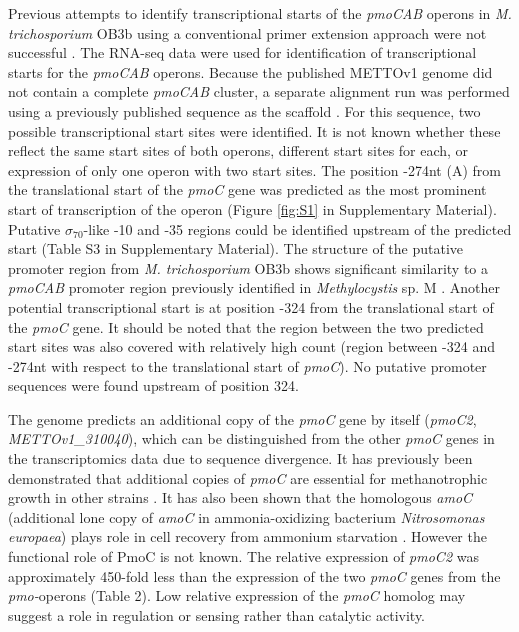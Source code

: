 Previous attempts to identify transcriptional starts of the \textit{pmoCAB} operons in \textit{M. trichosporium} OB3b using a conventional primer extension approach were not successful \cite{gilbert2000}.
The RNA-seq data were used for identification of transcriptional starts for the \textit{pmoCAB} operons.
Because the published METTOv1 genome did not contain a complete \textit{pmoCAB} cluster, a separate alignment run was performed using a previously published sequence as the scaffold \cite{holmes1995}.
For this sequence, two possible transcriptional start sites were identified.
It is not known whether these reflect the same start sites of both operons, different start sites for each, or expression of only one operon with two start sites.
The position -274nt (A) from the translational start of the \textit{pmoC} gene was predicted as the most prominent start of transcription of the operon (Figure \ref{fig:S1} in Supplementary Material).
Putative $\sigma_{70}$-like -10 and -35 regions could be identified upstream of the predicted start (Table S3 in Supplementary Material).
The structure of the putative promoter region from \textit{M. trichosporium} OB3b shows significant similarity to a \textit{pmoCAB} promoter region previously identified in \textit{Methylocystis} sp. M \cite{gilbert2000}.
Another potential transcriptional start is at position -324 from the translational start of the \textit{pmoC} gene.
It should be noted that the region between the two predicted start sites was also covered with relatively high count (region between -324 and -274nt with respect to the translational start of \textit{pmoC}).
No putative promoter sequences were found upstream of position 324.

The genome predicts an additional copy of the \textit{pmoC} gene by itself (\textit{pmoC2}, \textit{METTOv1\_310040}), which can be distinguished from the other \textit{pmoC} genes in the transcriptomics data due to sequence divergence.
It has previously been demonstrated that additional copies of \textit{pmoC} are essential for methanotrophic growth in other strains \cite{stolyar1999, dam2012a}.
It has also been shown that the homologous \textit{amoC} (additional lone copy of \textit{amoC} in ammonia-oxidizing bacterium \textit{Nitrosomonas europaea}) plays role in cell recovery from ammonium starvation \cite{berube2012}.
However the functional role of PmoC is not known.
The relative expression of \textit{pmoC2} was approximately 450-fold less than the expression of the two \textit{pmoC} genes from the \textit{pmo-}operons (Table 2).
Low relative expression of the \textit{pmoC} homolog may suggest a role in regulation or sensing rather than catalytic activity.

